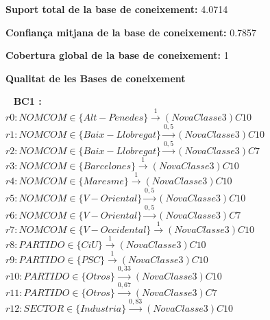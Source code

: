 {\bf Suport total de la base de coneixement:} 4.0714

{\bf Confian\c ca mitjana de la base de coneixement:} 0.7857

{\bf Cobertura global de la base de coneixement:} 1
\newpage
\mbox{ } \vfill
\begin{center} \Large \bf Qualitat de les Bases de coneixement \end{center} \vfill

\newpage
\mbox{ }
{\Large \bf BC1 :}\\

$r0: NOMCOM \in  \{ Alt-Penedes \} \stackrel{1}{\longrightarrow} (NovaClasse3)C10$\\

$r1: NOMCOM \in  \{ Baix-Llobregat \} \stackrel{0,5}{\longrightarrow} (NovaClasse3)C10$\\

$r2: NOMCOM \in  \{ Baix-Llobregat \} \stackrel{0,5}{\longrightarrow} (NovaClasse3)C7$\\

$r3: NOMCOM \in  \{ Barcelones \} \stackrel{1}{\longrightarrow} (NovaClasse3)C10$\\

$r4: NOMCOM \in  \{ Maresme \} \stackrel{1}{\longrightarrow} (NovaClasse3)C10$\\

$r5: NOMCOM \in  \{ V-Oriental \} \stackrel{0,5}{\longrightarrow} (NovaClasse3)C10$\\

$r6: NOMCOM \in  \{ V-Oriental \} \stackrel{0,5}{\longrightarrow} (NovaClasse3)C7$\\

$r7: NOMCOM \in  \{ V-Occidental \} \stackrel{1}{\longrightarrow} (NovaClasse3)C10$\\

$r8: PARTIDO \in  \{ CiU \} \stackrel{1}{\longrightarrow} (NovaClasse3)C10$\\

$r9: PARTIDO \in  \{ PSC \} \stackrel{1}{\longrightarrow} (NovaClasse3)C10$\\

$r10: PARTIDO \in  \{ Otros \} \stackrel{0,33}{\longrightarrow} (NovaClasse3)C10$\\

$r11: PARTIDO \in  \{ Otros \} \stackrel{0,67}{\longrightarrow} (NovaClasse3)C7$\\

$r12: SECTOR \in  \{ Industria \} \stackrel{0,83}{\longrightarrow} (NovaClasse3)C10$\\

